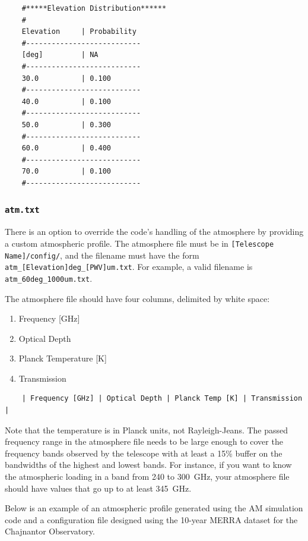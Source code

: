 \documentclass[11pt]{article} %
\begin{document}
\begin{lstlisting}
	#*****Elevation Distribution******
	#
	Elevation     | Probability
	#---------------------------
	[deg]         | NA
	#---------------------------
	30.0          | 0.100
	#---------------------------
	40.0          | 0.100
	#---------------------------
	50.0          | 0.300
	#---------------------------
	60.0          | 0.400
	#---------------------------
	70.0          | 0.100
	#---------------------------
\end{lstlisting}


\subsubsection{\texttt{atm.txt}}

There is an option to override the code's handling of the atmosphere by providing a custom atmospheric profile. The atmosphere file must be in \texttt{[Telescope Name]/config/}, and the filename must have the form \texttt{atm\_[Elevation]deg\_[PWV]um.txt}. For example, a valid filename is \texttt{atm\_60deg\_1000um.txt}.

The atmosphere file should have four columns, delimited by white space:

\begin{enumerate}[noitemsep,topsep=0pt]
	\item Frequency [GHz]
	\item Optical Depth
	\item Planck Temperature [K]
	\item Transmission
\end{enumerate} 

\begin{lstlisting}
	| Frequency [GHz] | Optical Depth | Planck Temp [K] | Transmission |
\end{lstlisting}

Note that the temperature is in Planck units, not Rayleigh-Jeans. The passed frequency range in the atmosphere file needs to be large enough to cover the frequency bands observed by the telescope with at least a 15\% buffer on the bandwidths of the highest and lowest bands. For instance, if you want to know the atmospheric loading in a band from 240 to 300~GHz, your atmosphere file should have values that go up to at least 345~GHz.

Below is an example of an atmospheric profile generated using the AM simulation code and a configuration file designed using the 10-year MERRA dataset for the Chajnantor Observatory.
\end{document}
